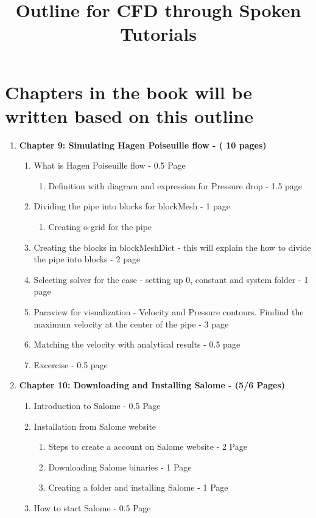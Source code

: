 \documentclass[12pt]{article}
\title{Outline for CFD through Spoken Tutorials}
\author{}
\date{}
\begin{document}
\maketitle
\section*{Chapters in the book will be written based on this outline}
\begin{enumerate}
\setcounter{enumi}8
\item \textbf{Chapter 9: Simulating Hagen Poiseuille flow - ( 10 pages)}
\begin{enumerate}[label*=\arabic*.]
\item What is Hagen Poiseuille flow - 0.5 Page
\begin{enumerate}[label*=\arabic*.]
\item Definition with diagram and expression for Pressure drop - 1.5 page 
\end{enumerate}
\item Dividing the pipe into blocks for blockMesh - 1 page
\begin{enumerate}[label*=\arabic*.]
\item Creating o-grid for the pipe 
\end{enumerate}
\item Creating the blocks in blockMeshDict - this will explain the how to divide the pipe into blocks - 2 page 
\item Selecting solver for the case - setting up 0, constant and system folder - 1 page
\item Paraview for visualization - Velocity and Pressure contours. Findind the maximum velocity at the center of the pipe - 3 page
\item Matching the velocity with analytical results - 0.5 page
\item Excercise - 0.5 page
\end{enumerate}

\item \textbf{Chapter 10: Downloading and Installing Salome - (5/6 Pages)}
\begin{enumerate}[label*=\arabic*.]
\item Introduction to Salome - 0.5 Page
\item Installation from Salome website 
\begin{enumerate}[label*=\arabic*.]
\item Steps to create a account on Salome website - 2 Page
\item Downloading Salome binaries - 1 Page
\item Creating a folder and installing Salome - 1 Page  
\end{enumerate}
\item How to start Salome - 0.5 Page
\end{enumerate}


\end{enumerate}
\end{document}

